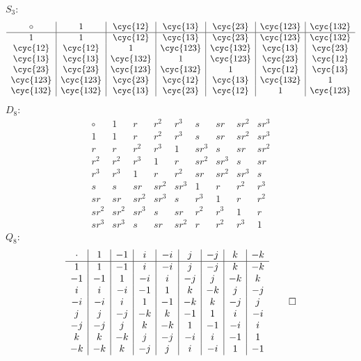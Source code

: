 \begin{sol}
    \leavevmode

    \noindent $S_3$:
    \[
    	\begin{array}{c|c|c|c|c|c|c}
            \circ & 1 & \cyc{1 2} & \cyc{1 3} & \cyc{2 3} & \cyc{1 2 3} & \cyc{1 3 2} \\
            \hline
            1 & 1 & \cyc{1 2} & \cyc{1 3} & \cyc{2 3} & \cyc{1 2 3} & \cyc{1 3 2} \\
            \cyc{1 2} & \cyc{1 2} & 1 & \cyc{1 2 3} & \cyc{1 3 2} & \cyc{1 3} & \cyc{2 3} \\
            \cyc{1 3} & \cyc{1 3} & \cyc{1 3 2} & 1 & \cyc{1 2 3} & \cyc{2 3} & \cyc{1 2} \\
            \cyc{2 3} & \cyc{2 3} & \cyc{1 2 3} & \cyc{1 3 2} & 1 & \cyc{1 2} & \cyc{1 3} \\ 
            \cyc{1 2 3} & \cyc{1 2 3} & \cyc{2 3} & \cyc{1 2} & \cyc{1 3} & \cyc{1 3 2} & 1 \\
            \cyc{1 3 2} & \cyc{1 3 2} & \cyc{1 3} & \cyc{2 3} & \cyc{1 2} & 1 & \cyc{1 2 3}
        \end{array}
	\]
    $D_8$:
    \[
    	\begin{array}{c|c|c|c|c|c|c|c|c}
            \circ & 1 & r & r^2 & r^3 & s & sr & sr^2 & sr^3 \\
            \hline
            1 & 1 & r & r^2 & r^3 & s & sr & sr^2 & sr^3 \\
            r & r & r^2 & r^3 & 1 & sr^3 & s & sr & sr^2 \\
            r^2 & r^2 & r^3 & 1 & r & sr^2 & sr^3 & s & sr \\
            r^3 & r^3 & 1 & r & r^2 & sr & sr^2 & sr^3 & s \\
            s & s & sr & sr^2 & sr^3 & 1 & r & r^2 & r^3 \\
            sr & sr & sr^2 & sr^3 & s & r^3 & 1 & r & r^2 \\
            sr^2 & sr^2 & sr^3 & s & sr & r^2 & r^3 & 1 & r \\
            sr^3 & sr^3 & s & sr & sr^2 & r & r^2 & r^3 & 1
        \end{array}
	\]
    $Q_8$:
    \[
    	\begin{array}{c|c|c|c|c|c|c|c|c}
            \cdot & 1 & -1 & i & -i & j & -j & k & -k \\
            \hline
            1 & 1 & -1 & i & -i & j & -j & k & -k \\
            -1 & -1 & 1 & -i & i & -j & j & -k & k \\
            i & i & -i & -1 & 1 & k & -k & j & -j \\
            -i & -i & i & 1 & -1 & -k & k & -j & j \\
            j & j & -j & -k & k & -1 & 1 & i & -i \\
            -j & -j & j & k & -k & 1 & -1 & -i & i \\
            k & k & -k & j & -j & -i & i & -1 & 1 \\
            -k & -k & k & -j & j & i & -i & 1 & -1
        \end{array} \qedhere
	\]
\end{sol}

